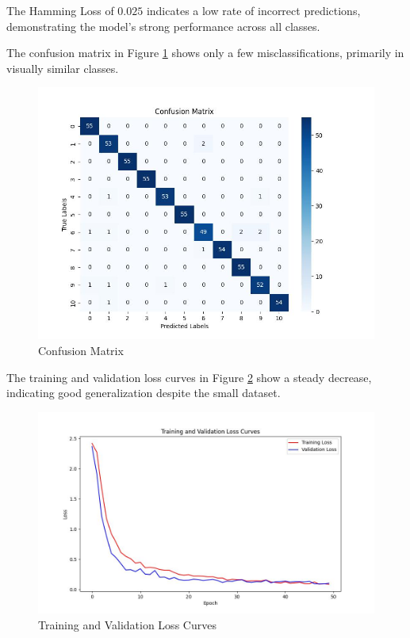 \documentclass[conference]{IEEEtran}
\begin{document}
The Hamming Loss of $0.025$ indicates a low rate of incorrect predictions, demonstrating the model's strong performance across all classes.

The confusion matrix in Figure \ref{fig:confusion_matrix} shows only a few misclassifications, primarily in visually similar classes.

\begin{figure}[h]
\centering
\includegraphics[width=1\linewidth]{confusion_matrix.jpg}
\caption{Confusion Matrix}
\label{fig:confusion_matrix}
\end{figure}

The training and validation loss curves in Figure \ref{fig:loss_curves} show a steady decrease, indicating good generalization despite the small dataset.

\begin{figure}[h]
\centering
\includegraphics[width=1\linewidth]{loss_curves.jpg}
\caption{Training and Validation Loss Curves}
\label{fig:loss_curves}
\end{figure}
\end{document}
